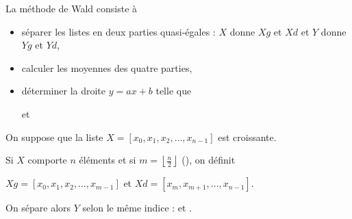 La méthode de Wald consiste à

\begin{itemize}
\item séparer les listes en deux parties quasi-égales : $X$ donne $Xg$ et $Xd$ et $Y$ donne $Yg$ et $Yd$,

\item calculer les moyennes des quatre parties,

\item déterminer la droite $y=ax+b$ telle que 

 et 
\end{itemize}

\medskip

On suppose que la liste $X=[x_0, x_1,x_2,\ldots,x_{n-1}]$ est croissante.

Si $X$ comporte $n$ éléments et si $m=\left\lfloor\frac n 2\right\rfloor$ (), on définit 

$Xg=[x_0, x_1,x_2,\ldots,x_{m-1}]$ et $Xd=[x_m, x_{m+1}, \ldots,x_{n-1}]$.

On sépare alors $Y$ selon le même indice :   et . 

